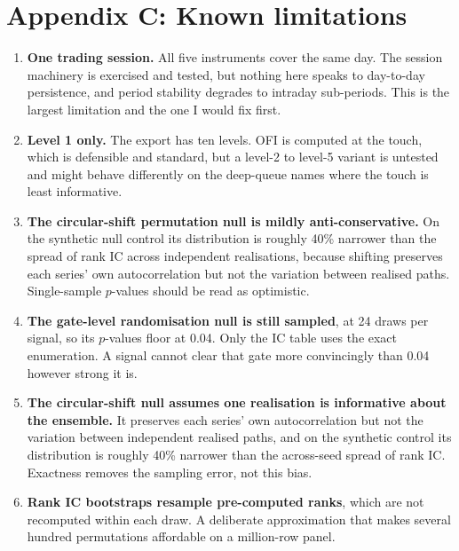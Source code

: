 \documentclass[11pt]{scrartcl}
\begin{document}
\section{Appendix C: Known limitations}
\label{sec:limitations}

\begin{enumerate}
\item \textbf{One trading session.} All five instruments cover the same day. The session machinery is exercised and tested, but nothing here speaks to day-to-day persistence, and period stability degrades to intraday sub-periods. This is the largest limitation and the one I would fix first.

\item \textbf{Level 1 only.} The export has ten levels. OFI is computed at the touch, which is defensible and standard, but a level-2 to level-5 variant is untested and might behave differently on the deep-queue names where the touch is least informative.

\item \textbf{The circular-shift permutation null is mildly anti-conservative.} On the synthetic null control its distribution is roughly 40\% narrower than the spread of rank IC across independent realisations, because shifting preserves each series' own autocorrelation but not the variation between realised paths. Single-sample $p$-values should be read as optimistic.

\item \textbf{The gate-level randomisation null is still sampled}, at 24 draws per signal, so its $p$-values floor at 0.04. Only the IC table uses the exact enumeration. A signal cannot clear that gate more convincingly than 0.04 however strong it is.

\item \textbf{The circular-shift null assumes one realisation is informative about the ensemble.} It preserves each series' own autocorrelation but not the variation between independent realised paths, and on the synthetic control its distribution is roughly 40\% narrower than the across-seed spread of rank IC. Exactness removes the sampling error, not this bias.

\item \textbf{Rank IC bootstraps resample pre-computed ranks}, which are not recomputed within each draw. A deliberate approximation that makes several hundred permutations affordable on a million-row panel.


\end{enumerate}
\end{document}
